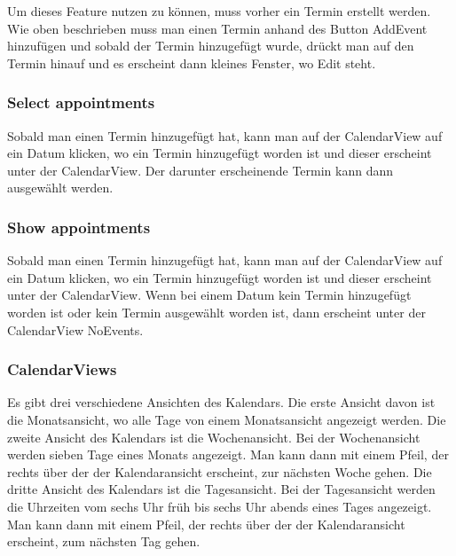 \documentclass[12pt]{scrartcl}
\begin{document}
        Um dieses Feature nutzen zu können, muss vorher ein Termin erstellt werden. Wie oben beschrieben muss man einen Termin
        anhand des Button AddEvent hinzufügen und sobald der Termin hinzugefügt wurde, drückt man auf den Termin hinauf und
        es erscheint dann kleines Fenster, wo Edit steht.   

    \subsubsection{Select appointments}
        Sobald man einen Termin hinzugefügt hat, kann man auf der CalendarView auf ein Datum klicken, wo ein Termin
        hinzugefügt worden ist und dieser erscheint unter der CalendarView. Der darunter erscheinende Termin kann dann 
        ausgewählt werden.
    
    \subsubsection{Show appointments}
        Sobald man einen Termin hinzugefügt hat, kann man auf der CalendarView auf ein Datum klicken, wo ein Termin
        hinzugefügt worden ist und dieser erscheint unter der CalendarView. Wenn bei einem Datum kein Termin hinzugefügt    
        worden ist oder kein Termin ausgewählt worden ist, dann erscheint unter der CalendarView NoEvents.
            
    \subsubsection{CalendarViews}
        Es gibt drei verschiedene Ansichten des Kalendars. Die erste Ansicht davon ist die Monatsansicht, wo alle Tage von
        einem Monatsansicht angezeigt werden. Die zweite Ansicht des Kalendars ist die Wochenansicht. Bei der Wochenansicht
        werden sieben Tage eines Monats angezeigt. Man kann dann mit einem Pfeil, der rechts über der der Kalendaransicht
        erscheint, zur nächsten Woche gehen. Die dritte Ansicht des Kalendars ist die Tagesansicht. Bei der Tagesansicht
        werden die Uhrzeiten vom sechs Uhr früh bis sechs Uhr abends eines Tages angezeigt. Man kann dann mit einem Pfeil, 
        der rechts über der der Kalendaransicht erscheint, zum nächsten Tag gehen.
\end{document}
